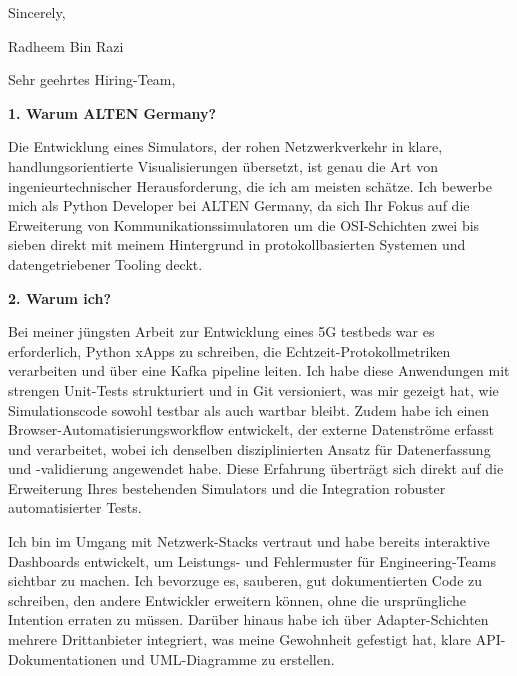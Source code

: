 \documentclass[11pt,a4paper]{coverletter}
\begin{document}
\closing{Sincerely,}{Radheem Bin Razi}

\clearpage
{}


\opening{Sehr geehrtes Hiring-Team,}

\vspace{8pt}\noindent\textbf{1. Warum ALTEN Germany?}\par\vspace{3pt}

Die Entwicklung eines Simulators, der rohen Netzwerkverkehr in klare, handlungsorientierte Visualisierungen übersetzt, ist genau die Art von ingenieurtechnischer Herausforderung, die ich am meisten schätze. Ich bewerbe mich als Python Developer bei ALTEN Germany, da sich Ihr Fokus auf die Erweiterung von Kommunikationssimulatoren um die OSI-Schichten zwei bis sieben direkt mit meinem Hintergrund in protokollbasierten Systemen und datengetriebener Tooling deckt.

\vspace{8pt}\noindent\textbf{2. Warum ich?}\par\vspace{3pt}

Bei meiner jüngsten Arbeit zur Entwicklung eines 5G testbeds war es erforderlich, Python xApps zu schreiben, die Echtzeit-Protokollmetriken verarbeiten und über eine Kafka pipeline leiten. Ich habe diese Anwendungen mit strengen Unit-Tests strukturiert und in Git versioniert, was mir gezeigt hat, wie Simulationscode sowohl testbar als auch wartbar bleibt. Zudem habe ich einen Browser-Automatisierungsworkflow entwickelt, der externe Datenströme erfasst und verarbeitet, wobei ich denselben disziplinierten Ansatz für Datenerfassung und -validierung angewendet habe. Diese Erfahrung überträgt sich direkt auf die Erweiterung Ihres bestehenden Simulators und die Integration robuster automatisierter Tests.

Ich bin im Umgang mit Netzwerk-Stacks vertraut und habe bereits interaktive Dashboards entwickelt, um Leistungs- und Fehlermuster für Engineering-Teams sichtbar zu machen. Ich bevorzuge es, sauberen, gut dokumentierten Code zu schreiben, den andere Entwickler erweitern können, ohne die ursprüngliche Intention erraten zu müssen. Darüber hinaus habe ich über Adapter-Schichten mehrere Drittanbieter integriert, was meine Gewohnheit gefestigt hat, klare API-Dokumentationen und UML-Diagramme zu erstellen.
\end{document}
